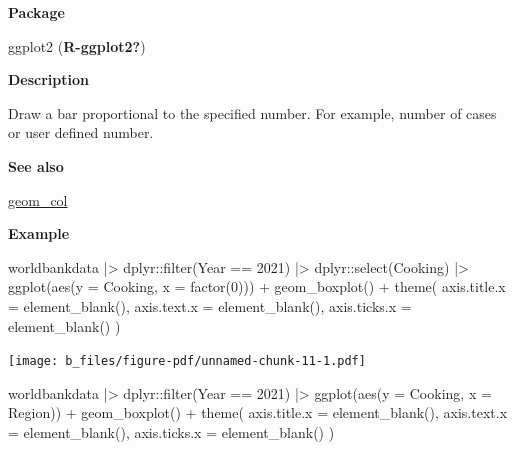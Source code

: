 \documentclass[
  letterpaper,
  DIV=11,
  numbers=noendperiod]{scrreprt}
\newenvironment{Shaded}{\begin{snugshade}}{\end{snugshade}}
\newcommand{\AttributeTok}[1]{\textcolor[rgb]{0.40,0.45,0.13}{#1}}
\newcommand{\DecValTok}[1]{\textcolor[rgb]{0.68,0.00,0.00}{#1}}
\newcommand{\FunctionTok}[1]{\textcolor[rgb]{0.28,0.35,0.67}{#1}}
\newcommand{\NormalTok}[1]{\textcolor[rgb]{0.00,0.23,0.31}{#1}}
\newcommand{\SpecialCharTok}[1]{\textcolor[rgb]{0.37,0.37,0.37}{#1}}
\begin{document}
\textbf{Package}

ggplot2 (\textbf{R-ggplot2?})

\textbf{Description}

Draw a bar proportional to the specified number. For example, number of
cases or user defined number.

\textbf{See also}

\hyperref[col]{geom\_col}

\textbf{Example}

\begin{Shaded}
\begin{Highlighting}[]
\NormalTok{worldbankdata }\SpecialCharTok{|\textgreater{}}
\NormalTok{  dplyr}\SpecialCharTok{::}\FunctionTok{filter}\NormalTok{(Year }\SpecialCharTok{==} \DecValTok{2021}\NormalTok{) }\SpecialCharTok{|\textgreater{}}
\NormalTok{  dplyr}\SpecialCharTok{::}\FunctionTok{select}\NormalTok{(Cooking) }\SpecialCharTok{|\textgreater{}}
  \FunctionTok{ggplot}\NormalTok{(}\FunctionTok{aes}\NormalTok{(}\AttributeTok{y =}\NormalTok{ Cooking, }\AttributeTok{x =} \FunctionTok{factor}\NormalTok{(}\DecValTok{0}\NormalTok{))) }\SpecialCharTok{+}
  \FunctionTok{geom\_boxplot}\NormalTok{() }\SpecialCharTok{+}
  \FunctionTok{theme}\NormalTok{(}
    \AttributeTok{axis.title.x =} \FunctionTok{element\_blank}\NormalTok{(),}
    \AttributeTok{axis.text.x =} \FunctionTok{element\_blank}\NormalTok{(),}
    \AttributeTok{axis.ticks.x =} \FunctionTok{element\_blank}\NormalTok{()}
\NormalTok{  )}
\end{Highlighting}
\end{Shaded}

\texttt{[image: b\_files/figure-pdf/unnamed-chunk-11-1.pdf]}

\begin{Shaded}
\begin{Highlighting}[]
\NormalTok{worldbankdata }\SpecialCharTok{|\textgreater{}}
\NormalTok{  dplyr}\SpecialCharTok{::}\FunctionTok{filter}\NormalTok{(Year }\SpecialCharTok{==} \DecValTok{2021}\NormalTok{) }\SpecialCharTok{|\textgreater{}}
  \FunctionTok{ggplot}\NormalTok{(}\FunctionTok{aes}\NormalTok{(}\AttributeTok{y =}\NormalTok{ Cooking, }\AttributeTok{x =}\NormalTok{ Region)) }\SpecialCharTok{+}
  \FunctionTok{geom\_boxplot}\NormalTok{() }\SpecialCharTok{+}
  \FunctionTok{theme}\NormalTok{(}
    \AttributeTok{axis.title.x =} \FunctionTok{element\_blank}\NormalTok{(),}
    \AttributeTok{axis.text.x =} \FunctionTok{element\_blank}\NormalTok{(),}
    \AttributeTok{axis.ticks.x =} \FunctionTok{element\_blank}\NormalTok{()}
\NormalTok{  )}
\end{Highlighting}
\end{Shaded}
\end{document}
